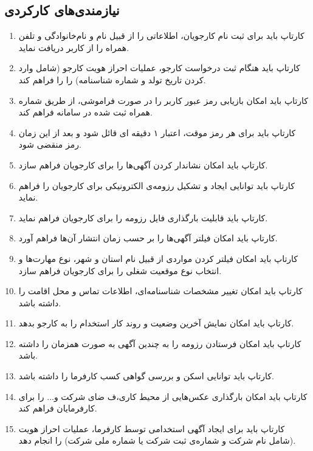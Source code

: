 \documentclass{report}
\begin{document}
			\subsection{نیازمندی‌های کارکردی}
				\begin{enumerate}
					\item 
					کارتاپ باید برای ثبت نام کارجویان، اطلاعاتی را از قبیل نام و نام‌خانوادگی و تلفن همراه را از کاربر دریافت نماید.
					\item 
					کارتاپ باید هنگام ثبت درخواست کارجو، عملیات احراز هویت کارجو (شامل وارد کردن تاریخ تولد و شماره شناسنامه) را را فراهم کند.
					\item 
					کارتاپ باید امکان بازیابی رمز عبور کاربر را در صورت فراموشی، از طریق شماره همراه ثبت شده در سامانه فراهم کند.
					
					\item 
					کارتاپ باید برای هر رمز موقت، اعتبار ۱ دقیقه ای قائل شود و بعد از این زمان رمز منقضی شود.
					\item 
					کارتاپ باید امکان نشاندار کردن آگهی‌ها را برای کارجویان فراهم سازد.
					
					\item 
					کارتاپ باید توانایی ایجاد و تشکیل رزومه‌ی الکترونیکی برای کارجویان را فراهم نماید.
					\item 
					کارتاپ باید قابلیت بارگذاری فایل رزومه را برای کارجویان فراهم نماید.
					\item 
					کارتاپ باید امکان فیلتر آگهی‌ها را بر حسب زمان انتشار آن‌ها فراهم آورد.
					\item 
					کارتاپ باید امکان فیلتر کردن مواردی از قبیل نام استان و شهر، نوع مهارت‌ها و انتخاب نوع موقعیت شغلی را برای کارجویان فراهم سازد.
					
					\item 
					کارتاپ باید امکان تغییر مشخصات شناسنامه‌ای، اطلاعات تماس و محل اقامت را داشته باشد.
					\item 
					کارتاپ باید امکان نمایش آخرین وضعیت و روند کار استخدام را به کارجو بدهد.
					\item 
					کارتاپ باید امکان فرستادن رزومه را به چندین آگهی به صورت همزمان را داشته باشد.
					\item 
					کارتاپ باید توانایی اسکن و بررسی گواهی کسب کارفرما را داشته باشد.
					\item 
					کارتاپ باید امکان بارگذاری عکس‌هایی از محیط کاری،ف ضای شرکت و... را برای کارفرمایان فراهم کند.
					
					\item 
					کارتاپ باید برای ایجاد آگهی استخدامی توسط کارفرما، عملیات احراز هویت (شامل نام شرکت و شماره‌ی ثبت شرکت یا شماره ملی شرکت) را انجام دهد.
					

\end{enumerate}
\end{document}

